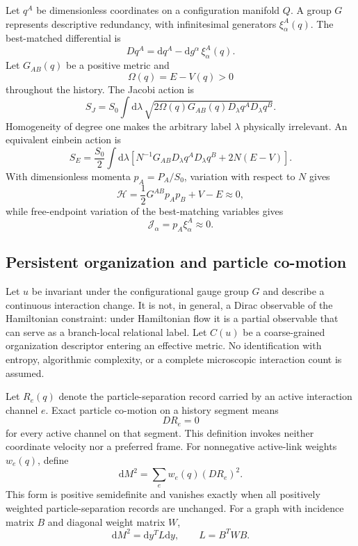 \documentclass[11pt]{article}
\theoremstyle{plain}
\newcommand{\dd}{\mathrm d}
\begin{document}
Let $q^A$ be dimensionless coordinates on a configuration manifold $Q$. A group $G$ represents descriptive redundancy, with infinitesimal generators $\xi_\alpha^A(q)$. The best-matched differential is
\begin{equation}
Dq^A=\dd q^A-\dd g^\alpha\,\xi_\alpha^A(q).
\end{equation}
Let $G_{AB}(q)$ be a positive metric and
\begin{equation}
\Omega(q)=E-V(q)>0
\end{equation}
throughout the history. The Jacobi action is
\begin{equation}
S_J=S_0\int\dd\lambda\,\sqrt{2\Omega(q)G_{AB}(q)D_\lambda q^A D_\lambda q^B}.
\end{equation}
Homogeneity of degree one makes the arbitrary label $\lambda$ physically irrelevant. An equivalent einbein action is
\begin{equation}
S_E=\frac{S_0}{2}\int\dd\lambda\left[N^{-1}G_{AB}D_\lambda q^A D_\lambda q^B+2N(E-V)\right].
\end{equation}
With dimensionless momenta $p_A=P_A/S_0$, variation with respect to $N$ gives
\begin{equation}
\mathcal H=\frac12G^{AB}p_Ap_B+V-E\approx0,
\end{equation}
while free-endpoint variation of the best-matching variables gives
\begin{equation}
\mathcal J_\alpha=p_A\xi_\alpha^A\approx0.
\end{equation}

\subsection{Persistent organization and particle co-motion}

Let $u$ be invariant under the configurational gauge group $G$ and describe a continuous interaction change. It is not, in general, a Dirac observable of the Hamiltonian constraint: under Hamiltonian flow it is a partial observable that can serve as a branch-local relational label. Let $C(u)$ be a coarse-grained organization descriptor entering an effective metric. No identification with entropy, algorithmic complexity, or a complete microscopic interaction count is assumed.

Let $R_e(q)$ denote the particle-separation record carried by an active interaction channel $e$. Exact particle co-motion on a history segment means
\begin{equation}
DR_e=0
\end{equation}
for every active channel on that segment. This definition invokes neither coordinate velocity nor a preferred frame. For nonnegative active-link weights $w_e(q)$, define
\begin{equation}
\dd M^2=\sum_e w_e(q)(DR_e)^2.
\end{equation}
This form is positive semidefinite and vanishes exactly when all positively weighted particle-separation records are unchanged. For a graph with incidence matrix $B$ and diagonal weight matrix $W$,
\begin{equation}
\dd M^2=\dd y^{T}L\dd y,\qquad L=B^TWB.
\end{equation}
\end{document}
